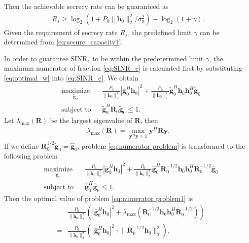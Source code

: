 \documentclass[journal]{IEEEtran}
\begin{document}
Then the achievable secrecy rate can be guaranteed as
\begin{eqnarray}
R_s \geq \log_2\left(1 + P_0\|\mathbf{h}_0\|_2^2/\sigma_n^2\right) - \log_2\left(1 + \gamma\right). \label{eq:secure_capacity1}
\end{eqnarray}
Given the requirement of secrecy rate $R_s$, the predefined limit $\gamma$ can be determined from \eqref{eq:secure_capacity1}.

In order to guarantee $\mathrm{SINR}_e$ to be within the predetermined limit $\gamma$, the maximum numerator of fraction \eqref{eq:SINR_e} is calculated first by substituting \eqref{eq:optimal_w} into \eqref{eq:SINR_e}. We obtain
\begin{equation}
\begin{aligned} \label{eq:numerator problem}
& \underset{\tilde{\mathbf{g}}_{0}}{\text{maximize}}
& & \frac{P_0}{\|\mathbf{h}_0\|_2^2}|\bar{\mathbf{g}}_0^H\mathbf{h}_0|^2 +\frac{P_0}{\|\mathbf{h}_0\|_2^2} \tilde{\mathbf{g}}_0^H\mathbf{h}_0\mathbf{h}_0^H\tilde{\mathbf{g}}_0 \\
& \text{subject to}
& & \tilde{\mathbf{g}}_0^H\mathbf{R}_0\tilde{\mathbf{g}}_0 \leq 1.
\end{aligned}
\end{equation}
Let $\lambda_{\mathrm{max}}(\mathbf{R})$ be the largest eigenvalue of $\mathbf{R}$, then
\begin{eqnarray}
\lambda_{\mathrm{max}}(\mathbf{R})= \max_{\mathbf{y}^H\mathbf{y} \leq 1} \mathbf{y}^H\mathbf{R}\mathbf{y}. \nonumber
\end{eqnarray}
If we define $\mathbf{R}_0^{1/2}\tilde{\mathbf{g}}_0 = \hat{\mathbf{g}}_0$, problem \eqref{eq:numerator problem} is transformed to the following problem
\begin{equation}
\begin{aligned} \label{eq:numerator problem1}
& \underset{\hat{\mathbf{g}}_{0}}{\text{maximize}}
& & \frac{P_0}{\|\mathbf{h}_0\|_2^2}|\bar{\mathbf{g}}_0^H\mathbf{h}_0|^2 +\frac{P_0}{\|\mathbf{h}_0\|_2^2} \hat{\mathbf{g}}_0^H\mathbf{R}_0^{-1/2}\mathbf{h}_0\mathbf{h}_0^H\mathbf{R}_0^{-1/2}\hat{\mathbf{g}}_0 \\
& \text{subject to}
& & \hat{\mathbf{g}}_0^H\hat{\mathbf{g}}_0 \leq 1.
\end{aligned}
\end{equation}
Then the optimal value of problem \eqref{eq:numerator problem1} is
\begin{eqnarray}
&&\frac{P_0}{\|\mathbf{h}_0\|_2^2}\left(|\bar{\mathbf{g}}_0^H\mathbf{h}_0|^2 + \lambda_{\mathrm{max}}(\mathbf{R}_0^{-1/2}\mathbf{h}_0\mathbf{h}_0^H\mathbf{R}_0^{-1/2})\right) \nonumber\\
&=&\frac{P_0}{\|\mathbf{h}_0\|_2^2}\left(|\bar{\mathbf{g}}_0^H\mathbf{h}_0|^2 + \|\mathbf{R}_0^{-1/2}\mathbf{h}_0\|_2^2\right)\label{eq:eigen_norm},
\end{eqnarray} 
\end{document}
